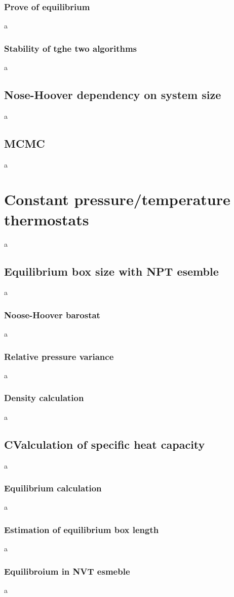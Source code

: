 \documentclass[10pt,a4paper]{report}
\begin{document}
\subsubsection{Prove of equilibrium}
a
\subsubsection{Stability of tghe two algorithms}
a
\subsection{Nose-Hoover dependency on system size}
a
\subsection{MCMC}
a


\section{Constant pressure/temperature thermostats}
a
\subsection{Equilibrium box size with NPT esemble}
a
\subsubsection{Noose-Hoover barostat}
a
\subsubsection{Relative pressure variance}
a
\subsubsection{Density calculation}
a
\subsection{CValculation of specific heat capacity}
a
\subsubsection{Equilibrium calculation}
a
\subsubsection{Estimation of equilibrium box length}
a
\subsubsection{Equilibroium in NVT esmeble}
a
\end{document}

